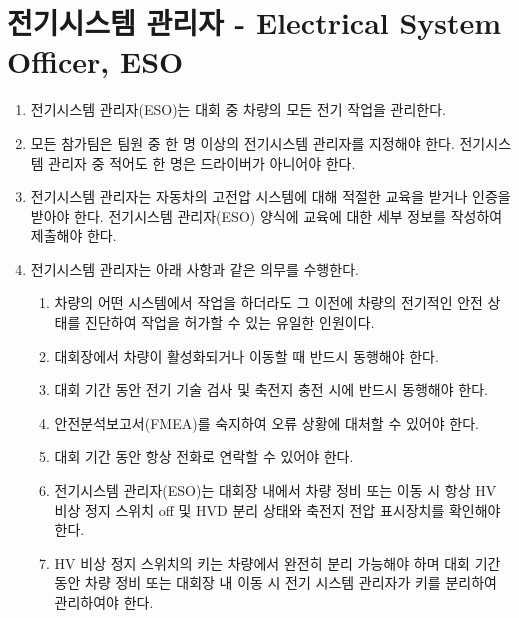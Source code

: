 \documentclass[final,a4paper,10pt]{report}
\begin{document}
\section{전기시스템 관리자 - Electrical System Officer, ESO}\label{rule:formula-technical.electrical-system-officer}
\begin{enumerate}
  \item\label{rule:formula-technical.electrical-system-officer.manages-electrical-work} 전기시스템 관리자(ESO)는 대회 중 차량의 모든 전기 작업을 관리한다.
  \item\label{rule:formula-technical.electrical-system-officer.designation-and-non-driver} 모든 참가팀은 팀원 중 한 명 이상의 전기시스템 관리자를 지정해야 한다. 전기시스템 관리자 중 적어도 한 명은 드라이버가 아니어야 한다.
  \item\label{rule:formula-technical.electrical-system-officer.hv-training-certification} 전기시스템 관리자는 자동차의 고전압 시스템에 대해 적절한 교육을 받거나 인증을 받아야 한다. 전기시스템 관리자(ESO) 양식에 교육에 대한 세부 정보를 작성하여 제출해야 한다.

  \item\label{rule:formula-technical.electrical-system-officer.duties} 전기시스템 관리자는 아래 사항과 같은 의무를 수행한다.
    \begin{enumerate}
      \item\label{rule:formula-technical.electrical-system-officer.duties.sole-work-authorization} 차량의 어떤 시스템에서 작업을 하더라도 그 이전에 차량의 전기적인 안전 상태를 진단하여 작업을 허가할 수 있는 유일한 인원이다.
      \item\label{rule:formula-technical.electrical-system-officer.duties.accompanies-when-active} 대회장에서 차량이 활성화되거나 이동할 때 반드시 동행해야 한다.
      \item\label{rule:formula-technical.electrical-system-officer.duties.accompanies-inspection-and-charging} 대회 기간 동안 전기 기술 검사 및 축전지 충전 시에 반드시 동행해야 한다.
      \item\label{rule:formula-technical.electrical-system-officer.duties.familiar-with-fmea} 안전분석보고서(FMEA)를 숙지하여 오류 상황에 대처할 수 있어야 한다.
      \item\label{rule:formula-technical.electrical-system-officer.duties.reachable-by-phone} 대회 기간 동안 항상 전화로 연락할 수 있어야 한다.
      \item\label{rule:formula-technical.electrical-system-officer.duties.verifies-shutdown-state} 전기시스템 관리자(ESO)는 대회장 내에서 차량 정비 또는 이동 시 항상 HV 비상 정지 스위치 off 및 HVD 분리 상태와 축전지 전압 표시장치를 확인해야 한다.
      \item\label{rule:formula-technical.electrical-system-officer.duties.holds-removable-estop-key} HV 비상 정지 스위치의 키는 차량에서 완전히 분리 가능해야 하며 대회 기간 동안 차량 정비 또는 대회장 내 이동 시 전기 시스템 관리자가 키를 분리하여 관리하여야 한다.
    \end{enumerate}


\end{enumerate}
\end{document}
